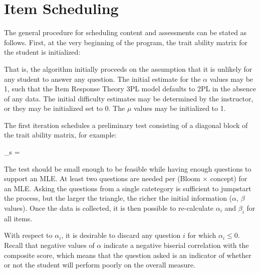 \section{Item Scheduling}
\label{sec:scheduler}

The general procedure for scheduling content and assessments can be stated as
follows.  First, at the very beginning of the program, the trait ability matrix
for the student is initialized:

\begin{equations}
  \Theta {}
\end{equations}

That is, the algorithm initially proceeds on the assumption that it is unlikely
for any student to answer any question.  The initial estimate for the $\alpha$
values may be 1, such that the Item Response Theory 3PL model defaults to 2PL
in the absence of any data.  The initial difficulty estimates may be determined
by the instructor, or they may be initialized set to 0.  The $\mu$ values may
be initialized to 1.

The first iteration schedules a preliminary test consisting of a diagonal block
of the trait ability matrix, for example:

\begin{equations}
\Theta_s =
\end{equations}

The test should be small enough to be feasible while having enough questions to
support an MLE.  At least two questions are needed per (Bloom $\times$ concept)
for an MLE.  Asking the questions from a single catetegory is sufficient to
jumpstart the process, but the larger the triangle, the richer the initial
information ($\alpha$, $\beta$ values).  Once the data is collected, it is then
possible to re-calculate $\alpha_i$ and $\beta_i$ for all items. 

With respect to $\alpha_i$, it is desirable to discard any question $i$ for
which $\alpha_i \leq 0$.  Recall that negative values of $\alpha$ indicate a
negative biserial correlation with the composite score, which means that the
question asked is an indicator of whether or not the student will perform
poorly on the overall measure.  

